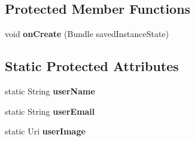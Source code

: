 \subsection*{\-Protected \-Member \-Functions}
\begin{DoxyCompactItemize}
\item 
\hypertarget{classcom_1_1example_1_1sel_1_1lostfound_1_1MainActivity_ac0ce1d56e609a8b69d6227c6d4d59f48}{void {\bfseries on\-Create} (\-Bundle saved\-Instance\-State)}\label{classcom_1_1example_1_1sel_1_1lostfound_1_1MainActivity_ac0ce1d56e609a8b69d6227c6d4d59f48}

\end{DoxyCompactItemize}
\subsection*{\-Static \-Protected \-Attributes}
\begin{DoxyCompactItemize}
\item 
\hypertarget{classcom_1_1example_1_1sel_1_1lostfound_1_1MainActivity_a1a8d41b931cf85891f5fd3497d34a32a}{static \-String {\bfseries user\-Name}}\label{classcom_1_1example_1_1sel_1_1lostfound_1_1MainActivity_a1a8d41b931cf85891f5fd3497d34a32a}

\item 
\hypertarget{classcom_1_1example_1_1sel_1_1lostfound_1_1MainActivity_a02198420522a5b05dbc3202b74dd9a59}{static \-String {\bfseries user\-Email}}\label{classcom_1_1example_1_1sel_1_1lostfound_1_1MainActivity_a02198420522a5b05dbc3202b74dd9a59}

\item 
\hypertarget{classcom_1_1example_1_1sel_1_1lostfound_1_1MainActivity_a92248fd7e13b4972f457ad9791ba253c}{static \-Uri {\bfseries user\-Image}}\label{classcom_1_1example_1_1sel_1_1lostfound_1_1MainActivity_a92248fd7e13b4972f457ad9791ba253c}

\end{DoxyCompactItemize}
